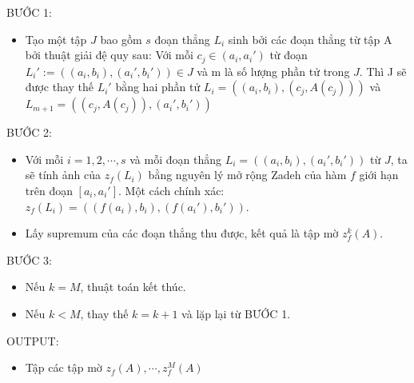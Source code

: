 \documentclass[../report.tex]{subfiles}
\begin{document}
BƯỚC 1:
\begin{itemize}
\item Tạo một tập $J$ bao gồm $s$ đoạn thẳng $L_i$ sinh bởi các đoạn 
    thẳng từ tập A bởi thuật giải đệ quy sau: Với mỗi $c_j \in (a_i, a_i')$
    từ đoạn $L_i' := ((a_i, b_i), (a_i', b_i')) \in J$ và m là số lượng
    phần tử trong $J$. Thì J sẽ được thay thế $L_i'$ bằng hai phần 
    tử $L_i=((a_i, b_i), (c_j, A(c_j)))$ và 
    $L_{m + 1} = ((c_j, A(c_j)),(a_i', b_i'))$
\end{itemize}

BƯỚC 2:
\begin{itemize}
\item Với mỗi $i = 1, 2, \cdots, s$ và mỗi đoạn thẳng 
    $L_i = ((a_i, b_i), (a_i', b_i'))$ từ $J$, 
    ta sẽ tính ảnh của $z_f(L_i)$ bằng nguyên lý mở rộng Zadeh của 
    hàm $f$ giới hạn trên đoạn $[a_i, a_i']$. Một cách chính xác: 
    $z_f(L_i) = ((f(a_i), b_i), (f(a_i'), b_i'))$.
\item Lấy supremum của các đoạn thẳng thu được, kết quả là tập mờ 
    $z_f^k(A)$.
\end{itemize}

BƯỚC 3:
\begin{itemize}
\item Nếu $k = M$, thuật toán kết thúc. 
\item Nếu $k < M$, thay thế $k = k + 1$ và lặp lại từ BƯỚC 1.
\end{itemize}

OUTPUT:
\begin{itemize}
\item Tập các tập mờ $z_f(A),\cdots,z_f^M(A)$
\end{itemize}
\end{document}
